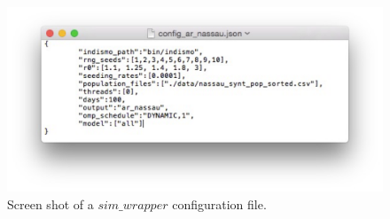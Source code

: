 \begin{figure}[h]
	\begin{center}
		\includegraphics[width=\textwidth]{images/screen_shot_config_file.pdf}  
	\end{center}
	\caption{Screen shot of a $sim\_wrapper$ configuration file.}
	\label{fig:config}
\end{figure}
